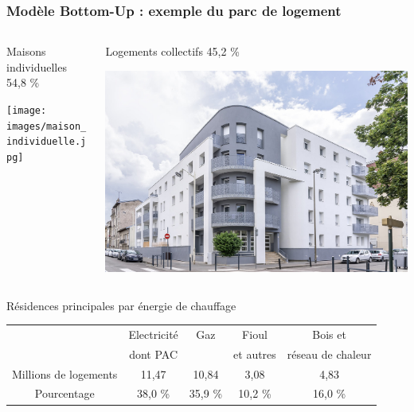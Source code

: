 \documentclass{beamer}
\begin{document}
\begin{frame}
\frametitle{Modèle Bottom-Up : exemple du parc de logement}
\vspace{0,2cm}
\begin{columns}
  \begin{column}{0.6\textwidth}
Maisons individuelles 54,8 \%

  \texttt{[image: images/maison\_individuelle.jpg]}
\end{column}
\begin{column}{0.4\textwidth}
Logements collectifs 45,2 \%

  \includegraphics[scale=0.12]{images/batiment_collectif.jpg}
\end{column}
\end{columns}
\vspace{0.5cm}
Résidences principales par énergie de chauffage
\vspace{0.3cm}
\small{
\begin{tabular}{c|c|c|c|c}
& Electricité & Gaz & Fioul & Bois et \\
& dont PAC & & et autres &réseau de chaleur \\ \hline 
Millions de logements & 11,47 & 10,84 & 3,08 & 4,83\\
Pourcentage & 38,0 \% & 35,9 \% & 10,2 \% & 16,0 \%
\end{tabular}
}
\end{frame}
\end{document}
